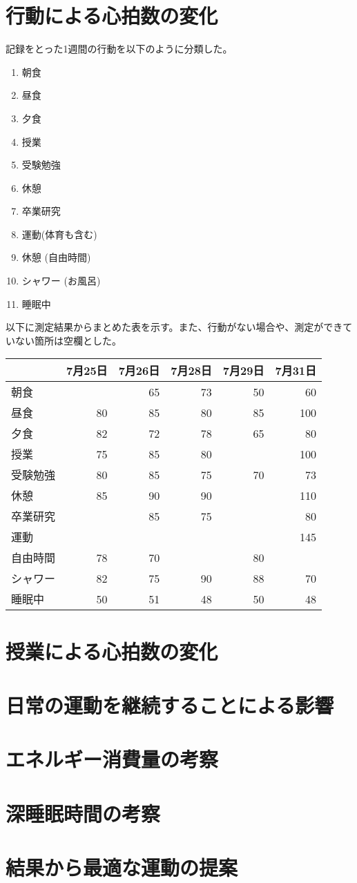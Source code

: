 \documentclass[a4paper,12pt, uplatex, fleqn]{jsarticle}
\title{}
\date{}
\author{林大地}
\begin{document}
\section{行動による心拍数の変化}
記録をとった1週間の行動を以下のように分類した。
\begin{enumerate}
    \item 朝食
    \item 昼食
    \item 夕食
    \item 授業
    \item 受験勉強
    \item 休憩
    \item 卒業研究
    \item 運動(体育も含む)
    \item 休憩 (自由時間)
    \item シャワー (お風呂)
    \item 睡眠中
\end{enumerate}

以下に測定結果からまとめた表を示す。また、行動がない場合や、測定ができていない箇所は空欄とした。

\begin{conter}
    \begin{tabular}{|l|rrrrr|} \hline
        & 7月25日 & 7月26日 & 7月28日 & 7月29日 & 7月31日 \\ \hline
        朝食 &  & 65 & 73 & 50 & 60 \\ \hline
        昼食 & 80 & 85 & 80 & 85 & 100 \\ \hline
        夕食 & 82 & 72 & 78 & 65 & 80 \\ \hline
        授業 & 75 & 85 & 80 &  & 100 \\ \hline
        受験勉強 & 80 & 85 & 75 & 70 & 73 \\ \hline
        休憩 & 85 & 90 & 90 &  & 110 \\ \hline
        卒業研究 &  & 85 & 75 &  & 80 \\ \hline
        運動 &  &  &  &  & 145 \\ \hline
        自由時間 & 78 & 70 &  & 80 &  \\ \hline
        シャワー & 82 & 75 & 90 & 88 & 70 \\ \hline
        睡眠中 & 50 & 51 & 48 & 50 & 48 \\ \hline
    \end{tabular}
\end{conter}

\section{授業による心拍数の変化}


\section{日常の運動を継続することによる影響}

\section{エネルギー消費量の考察}

\section{深睡眠時間の考察}

\section{結果から最適な運動の提案}
\end{document}
